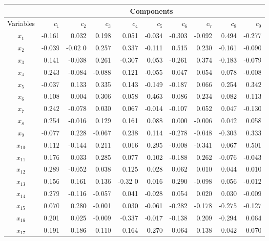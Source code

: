 \documentclass[10pt]{article}
\begin{document}
\begin{table}
\begin{center}
\begin{tabular}{crrrrrrrrr}
\hline
			& \multicolumn{9}{c}{Components}																					\\\hline
Variables   &	$c_1$  &  $c_2$        & 	$c_3$   &    $c_4$   &	$c_5$   &	$c_6$   &	$c_7$  	&	$c_8$  &	 $c_9$	\\
\hline
$x_1$	&	-0.161	&	0.032	&	0.198	&	0.051	&	-0.034	&	-0.303	&	-0.092	&	0.494	&	-0.277	\\
$x_2$	&	-0.039	&	-0.02	0       &	0.257	&	0.337	&	-0.111	&	0.515	&	0.230	&	-0.161	&	-0.090	\\
$x_3$	&	0.141	&	-0.038	&	0.261	&	-0.307	&	0.053	&	-0.261	&	0.374	&	-0.183	&	-0.079	\\
$x_4$	&	0.243	&	-0.084	&	-0.088	&	0.121	&	-0.055	&	0.047	&	0.054	&	0.078	&	-0.008	\\
$x_5$	&	-0.037	&	0.133	&	0.335	&	0.143	&	-0.149	&	-0.187	&	0.066	&	0.254	&	0.342	\\
$x_6$	&	-0.108	&	0.004	&	0.306	&	-0.058	&	0.463	&	-0.086	&	0.234	&	0.082	&	-0.113	\\
$x_7$	&	0.242	&	-0.078	&	0.030	&	0.067	&	-0.014	&	-0.107	&	0.052	&	0.047	&	-0.130	\\
$x_8$	&	0.254	&	-0.016	&	0.129	&	0.161	&	0.088	&	0.000	&	-0.006	&	0.042	&	0.058	\\
$x_9$	&	-0.077	&	0.228	&	-0.067	&	0.238	&	0.114	&	-0.278	&	-0.048	&	-0.303	&	0.333	\\
$x_{10}$	&	0.112	&	-0.144	&	0.211	&	0.016	&	0.295	&	-0.008	&	-0.341	&	0.067	&	0.501	\\
$x_{11}$	&	0.176	&	0.033	&	0.285	&	0.077	&	0.102	&	-0.188	&	0.262	&	-0.076	&	-0.043	\\
$x_{12}$  &	0.289	&	-0.052	&	0.038	&	0.125	&	0.028	&	0.062	&	0.010	&	0.044	&	0.010	\\
$x_{13}$	 &	0.156	&	0.161	&	0.136	&	-0.32	0      &	0.016	&	0.290	&	-0.098	&	0.056	&	-0.012	\\
$x_{14}$	&	0.279	&	-0.116	&	-0.057	&	0.041	&	-0.028	&	0.054	&	0.020	&	0.030	&	-0.009	\\
$x_{15}$	&	0.070       &	0.280    	&	-0.001	&	0.030	&	-0.061	&	-0.282	&	-0.178	&	-0.275	&	-0.127	\\
$x_{16}$	  &	0.201	&	0.025	&	-0.009	&	-0.337	&	-0.017	&	-0.138	&	0.209	&	-0.294	&	0.064	\\
$x_{17}$	&	0.191	&	0.186	&	-0.110	&	0.164	&	0.270	&	-0.064	&	-0.138	&	0.042	&	-0.070     \\	

\end{tabular}
\end{center}
\end{table}
\end{document}
